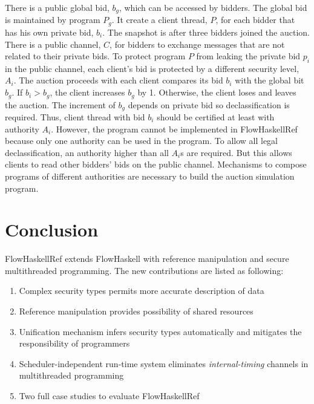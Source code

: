 \documentclass[a4paper]{report}
\begin{document}
There is a public global bid, $b_g$, which can be accessed by bidders. 
The global bid is maintained by program $P_g$. It create a client thread, $P$, for each 
bidder that has his own private bid, $b_i$.
The snapshot is after three bidders joined the auction. 
There is a public channel, $C$, for bidders to exchange messages that are not related to their private bids.
To protect program $P$ from leaking the private bid $p_i$ in the public channel, each client's bid is protected
by a different security level, $A_i$.  
The auction proceeds with each client compares its bid $b_i$ with the global bit $b_g$.
If $b_i>b_g$, the client increases $b_g$ by 1. Otherwise, the client loses and leaves the auction.
The increment of $b_g$ depends on private bid so declassification is required.
Thus, client thread with bid $b_i$ should be certified at least with authority $A_i$.
However, the program cannot be implemented in FlowHaskellRef because only one authority can be used in
the program. To allow all legal declassification, an authority higher than all $A_i$s are required.
But this allows clients to read other bidders' bids on the public channel.
Mechanisms to compose programs of different authorities are necessary to build the auction simulation program.


\section{Conclusion}
FlowHaskellRef extends FlowHaskell with reference manipulation and secure multithreaded programming.
The new contributions are listed as following:
\begin{enumerate}
\item Complex security types permits more accurate description of data
\item Reference manipulation provides possibility of shared resources
\item Unification mechanism infers security types automatically and mitigates the responsibility of programmers
\item Scheduler-independent run-time system eliminates {\em internal-timing} channels in multithreaded programming
\item Two full case studies to evaluate FlowHaskellRef
\end{enumerate}
\end{document}
